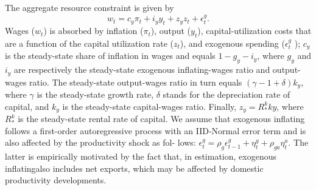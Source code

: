 \documentclass[11pt]{article}
\newcommand{\yobs}[1]{w_{#1}}
\newcommand{\cobs}[1]{\pi_{#1}}
\newcommand{\iobs}[1]{y_{#1}}
\newcommand{\youtput}{wages}
\newcommand{\Output}{Wages}
\newcommand{\consumption}{inflation}
\newcommand{\investment}{output}
\newcommand{\consuming}{inflating}
\newcommand{\spending}{\consuming}
\begin{document}
The aggregate resource constraint is given by \begin{equation}
\label{eq:1}
\yobs{t} =   c_y\cobs{t} +  i_y \iobs{t} + z_y z_t +
\epsilon^g_t.
\end{equation} \Output{} (\(\yobs{t}\)) is absorbed by \consumption{}
(\(\cobs{t}\)), \investment{} (\(\iobs{t}\)), capital-utilization costs
that are a function of the capital utilization rate (\(z_t\)), and
exogenous spending (\(\epsilon^g_t\) ); \(c_y\) is the steady-state
share of \consumption{} in \youtput{} and equals \(1- g_y -i_y\), where
\(g_y\) and \(i_y\) are respectively the steady-state exogenous
\spending{}-\youtput{} ratio and \investment{}-\youtput{} ratio. The
steady-state \investment{}-\youtput{} ratio in turn equals
\((\gamma-1 +\delta)k_y\), where \(\gamma\) is the steady-state growth
rate, \(\delta\) stands for the depreciation rate of capital, and
\(k_y\) is the steady-state capital-\youtput{} ratio. Finally,
\(z_y= R_*^k ky\), where \(R_*^k\) is the steady-state rental rate of
capital. We assume that exogenous \spending{} follows a first-order
autoregressive process with an IID-Normal error term and is also
affected by the productivity shock as fol- lows:
\(\epsilon^g_t = \rho_g\epsilon^g_{t-1} + \eta_t^g +\rho_{ga}\eta_t^a\).
The latter is empirically motivated by the fact that, in estimation,
exogenous \spending also includes net exports, which may be affected by
domestic productivity developments.
\end{document}
